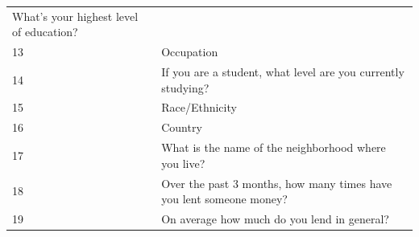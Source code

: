 \begin{longtable}[]{@{}ll@{}}
\begin{minipage}[t]{0.89\columnwidth}
What's your highest level of education?\strut
\end{minipage}\tabularnewline
\begin{minipage}[t]{0.05\columnwidth}\raggedright
13\strut
\end{minipage} & \begin{minipage}[t]{0.89\columnwidth}\raggedright
Occupation\strut
\end{minipage}\tabularnewline
\begin{minipage}[t]{0.05\columnwidth}\raggedright
14\strut
\end{minipage} & \begin{minipage}[t]{0.89\columnwidth}\raggedright
If you are a student, what level are you currently studying?\strut
\end{minipage}\tabularnewline
\begin{minipage}[t]{0.05\columnwidth}\raggedright
15\strut
\end{minipage} & \begin{minipage}[t]{0.89\columnwidth}\raggedright
Race/Ethnicity\strut
\end{minipage}\tabularnewline
\begin{minipage}[t]{0.05\columnwidth}\raggedright
16\strut
\end{minipage} & \begin{minipage}[t]{0.89\columnwidth}\raggedright
Country\strut
\end{minipage}\tabularnewline
\begin{minipage}[t]{0.05\columnwidth}\raggedright
17\strut
\end{minipage} & \begin{minipage}[t]{0.89\columnwidth}\raggedright
What is the name of the neighborhood where you live?\strut
\end{minipage}\tabularnewline
\begin{minipage}[t]{0.05\columnwidth}\raggedright
18\strut
\end{minipage} & \begin{minipage}[t]{0.89\columnwidth}\raggedright
Over the past 3 months, how many times have you lent someone
money?\strut
\end{minipage}\tabularnewline
\begin{minipage}[t]{0.05\columnwidth}\raggedright
19\strut
\end{minipage} & \begin{minipage}[t]{0.89\columnwidth}\raggedright
On average how much do you lend in general?\strut
\end{minipage}\tabularnewline

\end{longtable}
